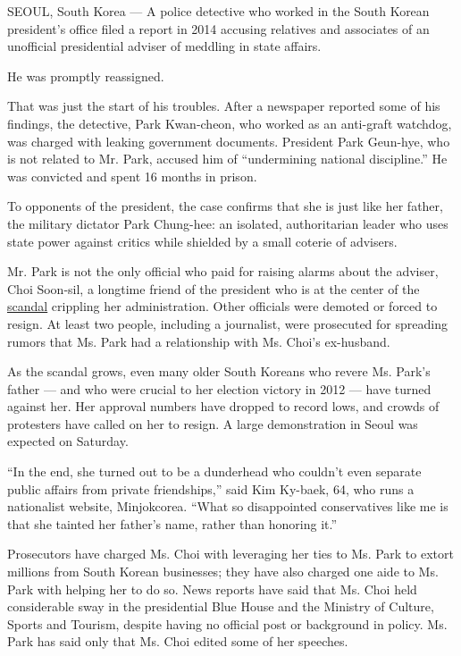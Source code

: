SEOUL, South Korea --- A police detective who worked in the South Korean
president's office filed a report in 2014 accusing relatives and
associates of an unofficial presidential adviser of meddling in state
affairs.

He was promptly reassigned.

That was just the start of his troubles. After a newspaper reported some
of his findings, the detective, Park Kwan-cheon, who worked as an
anti-graft watchdog, was charged with leaking government documents.
President Park Geun-hye, who is not related to Mr. Park, accused him of
``undermining national discipline.'' He was convicted and spent 16
months in prison.

To opponents of the president, the case confirms that she is just like
her father, the military dictator Park Chung-hee: an isolated,
authoritarian leader who uses state power against critics while shielded
by a small coterie of advisers.

Mr. Park is not the only official who paid for raising alarms about the
adviser, Choi Soon-sil, a longtime friend of the president who is at the
center of the
\href{http://www.nytimes.com/2016/11/06/world/asia/south-koreans-ashamed-over-les-secretive-adviser.html}{scandal}
crippling her administration. Other officials were demoted or forced to
resign. At least two people, including a journalist, were prosecuted for
spreading rumors that Ms. Park had a relationship with Ms. Choi's
ex-husband.

As the scandal grows, even many older South Koreans who revere Ms.
Park's father --- and who were crucial to her election victory in 2012
--- have turned against her. Her approval numbers have dropped to record
lows, and crowds of protesters have called on her to resign. A large
demonstration in Seoul was expected on Saturday.

``In the end, she turned out to be a dunderhead who couldn't even
separate public affairs from private friendships,'' said Kim Ky-baek,
64, who runs a nationalist website, Minjokcorea. ``What so disappointed
conservatives like me is that she tainted her father's name, rather than
honoring it.''

Prosecutors have charged Ms. Choi with leveraging her ties to Ms. Park
to extort millions from South Korean businesses; they have also charged
one aide to Ms. Park with helping her to do so. News reports have said
that Ms. Choi held considerable sway in the presidential Blue House and
the Ministry of Culture, Sports and Tourism, despite having no official
post or background in policy. Ms. Park has said only that Ms. Choi
edited some of her speeches.

